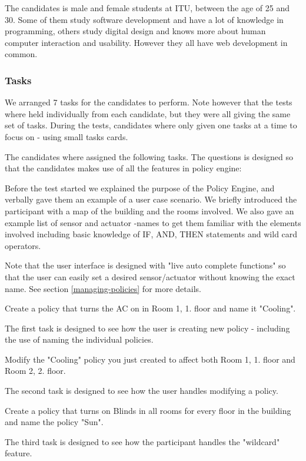 The candidates is male and female students at ITU, between the age of 25 and 30. Some of them study software development and have a lot of knowledge in programming, others study digital design and knows more about human computer interaction and usability. However they all have web development in common.

\subsubsection{Tasks}
We arranged 7 tasks for the candidates to perform.  Note however that the tests where held individually from each candidate, but they were all giving the same set of tasks. 
During the tests, candidates where only given one tasks at a time to focus on - using small tasks cards.

The candidates where assigned the following tasks. The questions is designed so that the candidates makes use of all the features in policy engine:

Before the test started we explained the purpose of the Policy Engine, and verbally gave them an example of a user case scenario.
We briefly introduced the participant with a map of the building and the rooms involved. We also gave an example list of sensor and actuator -names to get them familiar with the elements involved including basic knowledge of IF, AND, THEN statements and wild card operators.

Note that the user interface is designed with "live auto complete functions" so that the user can easily set a desired sensor/actuator without knowing the exact name. See section \ref{managing-policies} for more details.

\begin{framed}
Create a policy that turns the AC on in Room 1, 1. floor and name it "Cooling".
\end{framed}
The first task is designed to see how the user is creating new policy - including the use of naming the individual policies.

\begin{framed}
Modify the "Cooling" policy you just created to affect both Room 1, 1. floor and Room 2, 2. floor.
\end{framed}
The second task is designed to see how the user handles modifying a policy.

\begin{framed}
Create a policy that turns on Blinds in all rooms for every floor in the building and name the policy "Sun".
\end{framed}
The third task is designed to see how the participant handles the "wildcard" feature.

